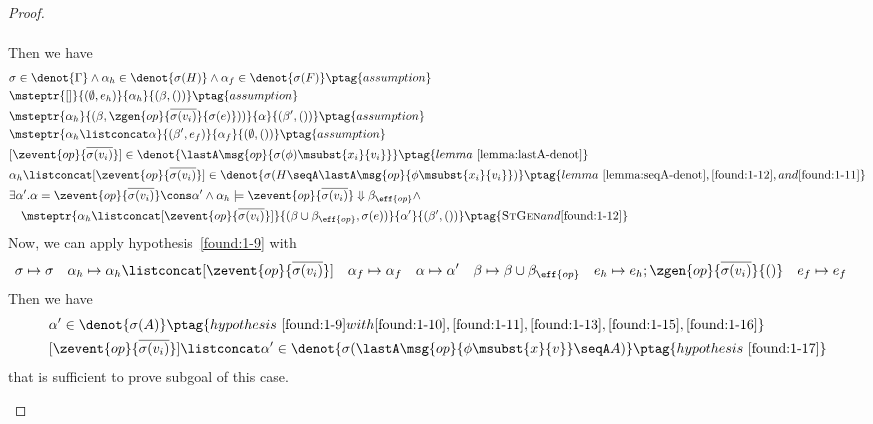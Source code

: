 \begin{proof}
\begin{enumerate}[label=Case]
{\begin{align*}
\end{align*}}\noindent
Then we have
{\footnotesize\begin{alignat}{2}
&\sigma \in \denot{\Gamma} \land \alpha_h \in \denot{\sigma(H)} \land  \alpha_f \in \denot{\sigma(F)} \ptag{assumption} \label{found:1-10}
\\& \msteptr{[]}{(\emptyset, e_h)}{\alpha_h}{(\beta, ())} \ptag{assumption} \label{found:1-11}
\\& \msteptr{\alpha_h}{(\beta, \zgen{op}{\overline{\sigma(v_i)}}{\sigma(e)}))}{\alpha}{(\beta', ())} \ptag{assumption} \label{found:1-12}
\\& \msteptr{\alpha_h \listconcat \alpha }{(\beta', e_f)}{\alpha_f}{(\emptyset, ())} \ptag{assumption} \label{found:1-13}
\\& [\zevent{op}{\overline{\sigma(v_i)}}] \in \denot{\lastA\msg{op}{\sigma(\phi)\msubst{x_i}{v_i}}} \ptag{lemma~\ref{lemma:lastA-denot}} \label{found:1-14}
\\& \alpha_h \listconcat [\zevent{op}{\overline{\sigma(v_i)}}] \in \denot{\sigma(H \seqA \lastA\msg{op}{\phi\msubst{x_i}{v_i}})} \ptag{lemma~\ref{lemma:seqA-denot}, \ref{found:1-12}, and \ref{found:1-11}} \label{found:1-15}
\\& \exists \alpha'. \alpha = \zevent{op}{\overline{\sigma(v_i)}} \cons \alpha' \land 
\alpha_h \models \zevent{op}{\overline{\sigma(v_i)}} \Downarrow \beta_{\eff{op}} \land \notag
\\&\quad\msteptr{\alpha_h \listconcat [\zevent{op}{\overline{\sigma(v_i)}}]}{(\beta \cup \beta_{\eff{op}}, \sigma(e))}{\alpha'}{(\beta', ())} \ptag{\textsc{StGen} and \ref{found:1-12}} \label{found:1-16}
\end{alignat}}\noindent
Now, we can apply hypothesis~\ref{found:1-9} with 
{\footnotesize\begin{align*}
    &\sigma \mapsto \sigma \quad \alpha_h \mapsto \alpha_h \listconcat [\zevent{op}{\overline{\sigma(v_i)}}] \quad \alpha_f \mapsto \alpha_f \quad \alpha \mapsto \alpha' \quad \beta \mapsto \beta \cup \beta_{\eff{op}} \quad 
    e_h \mapsto e_h; \zgen{op}{\overline{\sigma(v_i)}}{()} \quad e_f \mapsto e_f
\end{align*}}\noindent
Then we have
{\footnotesize\begin{alignat}{2}
&\alpha' \in\denot{\sigma(A)} \ptag{hypothesis~\ref{found:1-9} with \ref{found:1-10}, \ref{found:1-11}, \ref{found:1-13}, \ref{found:1-15}, \ref{found:1-16}} \label{found:1-17}
\\&[\zevent{op}{\overline{\sigma(v_i)}}] \listconcat \alpha' \in\denot{\sigma(\lastA\msg{op}{\phi\msubst{x}{v}} \seqA A)}\ptag{hypothesis~\ref{found:1-17}} \label{found:1-18}
\end{alignat}}\noindent
that is sufficient to prove subgoal of this case.


\end{enumerate}
\end{proof}
